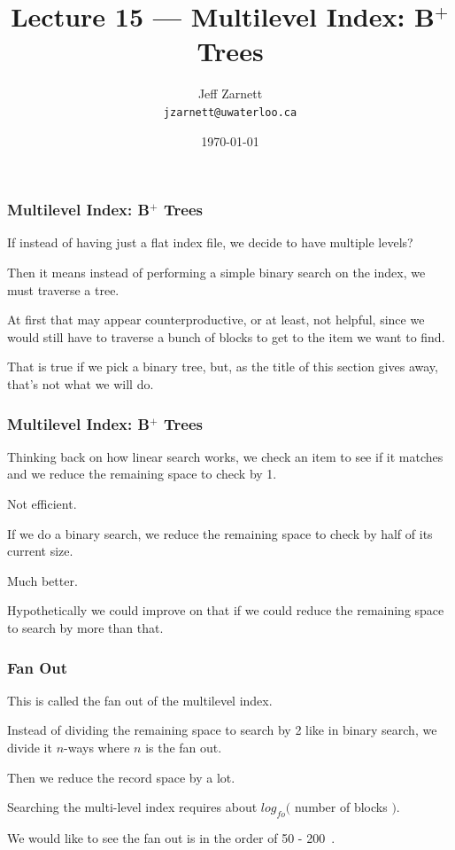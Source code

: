 

\title{Lecture 15 --- Multilevel Index: B$^{+}$ Trees }

\author{Jeff Zarnett \\ \small \texttt{jzarnett@uwaterloo.ca}}
\date{\today}




\begin{frame}
  \titlepage

 \end{frame}



\begin{frame}
\frametitle{Multilevel Index: B$^{+}$ Trees}

If instead of having just a flat index file, we decide to have multiple levels? 

Then it means instead of performing a simple binary search on the index, we must traverse a tree. 

At first that may appear counterproductive, or at least, not helpful, since we would still have to traverse a bunch of blocks to get to the item we want to find. 

That is true if we pick a binary tree, but, as the title of this section gives away, that's not what we will do.

\end{frame}


\begin{frame}
\frametitle{Multilevel Index: B$^{+}$ Trees}

Thinking back on how linear search works, we check an item to see if it matches and we reduce the remaining space to check by 1. 

Not efficient. 

If we do a binary search, we reduce the remaining space to check by half of its current size. 

Much better. 

Hypothetically we could improve on that if we could reduce the remaining space to search by more than that. 


\end{frame}

\begin{frame}
\frametitle{Fan Out}

This is called the \alert{fan out} of the multilevel index. 

Instead of dividing the remaining space to search by 2 like in binary search, we divide it $n$-ways where $n$ is the fan out. 

Then we reduce the record space by a lot.

Searching the multi-level index requires about $log_{fo}($ number of blocks $)$. 

We would like to see the fan out is in the order of 50 - 200~\cite{fds}.


\end{frame}

